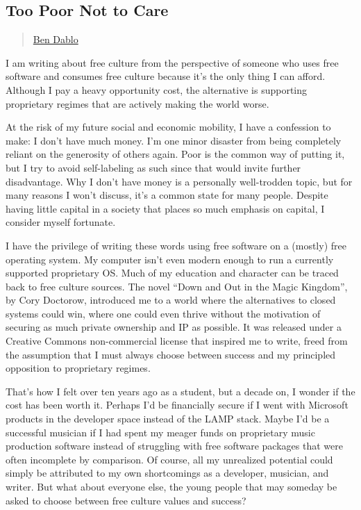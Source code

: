 \subsection{Too Poor Not to Care}\label{too-poor-not-to-care}

\begin{quote}
\href{../appendix/attributions.html\#ben-dablo}{Ben Dablo}
\end{quote}

I am writing about free culture from the perspective of someone who uses
free software and consumes free culture because it's the only thing I
can afford. Although I pay a heavy opportunity cost, the alternative is
supporting proprietary regimes that are actively making the world worse.

At the risk of my future social and economic mobility, I have a
confession to make: I don't have much money. I'm one minor disaster from
being completely reliant on the generosity of others again. Poor is the
common way of putting it, but I try to avoid self-labeling as such since
that would invite further disadvantage. Why I don't have money is a
personally well-trodden topic, but for many reasons I won't discuss,
it's a common state for many people. Despite having little capital in a
society that places so much emphasis on capital, I consider myself
fortunate.

I have the privilege of writing these words using free software on a
(mostly) free operating system. My computer isn't even modern enough to
run a currently supported proprietary OS. Much of my education and
character can be traced back to free culture sources. The novel ``Down
and Out in the Magic Kingdom'', by Cory Doctorow, introduced me to a
world where the alternatives to closed systems could win, where one
could even thrive without the motivation of securing as much private
ownership and IP as possible. It was released under a Creative Commons
non-commercial license that inspired me to write, freed from the
assumption that I must always choose between success and my principled
opposition to proprietary regimes.

That's how I felt over ten years ago as a student, but a decade on, I
wonder if the cost has been worth it. Perhaps I'd be financially secure
if I went with Microsoft products in the developer space instead of the
LAMP stack. Maybe I'd be a successful musician if I had spent my meager
funds on proprietary music production software instead of struggling
with free software packages that were often incomplete by comparison. Of
course, all my unrealized potential could simply be attributed to my own
shortcomings as a developer, musician, and writer. But what about
everyone else, the young people that may someday be asked to choose
between free culture values and success?

